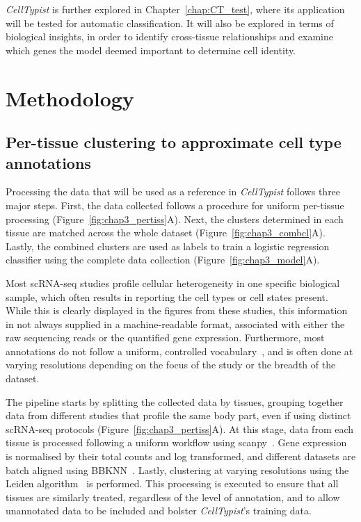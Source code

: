 \textit{CellTypist} is further explored in Chapter~\ref{chap:CT_test}, where its application will be tested for automatic classification. It will also be explored in terms of biological insights, in order to identify cross-tissue relationships and examine which genes the model deemed important to determine cell identity.



\section{Methodology}
\label{section3.2}
\subsection{Per-tissue clustering to approximate cell type annotations}
\label{section3.2.1}
Processing the data that will be used as a reference in \textit{CellTypist} follows three major steps. First, the data collected follows a procedure for uniform per-tissue processing (Figure~\ref{fig:chap3_pertiss}A). Next, the clusters determined in each tissue are matched across the whole dataset (Figure~\ref{fig:chap3_combcl}A). Lastly, the combined clusters are used as labels to train a logistic regression classifier using the complete data collection (Figure~\ref{fig:chap3_model}A).

Most scRNA-seq studies profile cellular heterogeneity in one specific biological sample, which often results in reporting the cell types or cell states present. While this is clearly displayed in the figures from these studies, this information in not always supplied in a machine-readable format, associated with either the raw sequencing reads or the quantified gene expression. Furthermore, most annotations do not follow a uniform, controlled vocabulary~\citep{bard_ontology_2005}, and is often done at varying resolutions depending on the focus of the study or the breadth of the dataset.

The pipeline starts by splitting the collected data by tissues, grouping together data from different studies that profile the same body part, even if using distinct scRNA-seq protocols (Figure~\ref{fig:chap3_pertiss}A). At this stage, data from each tissue is processed following a uniform workflow using scanpy~\citep{wolf_scanpy:_2018}. Gene expression is normalised by their total counts and log transformed, and different datasets are batch aligned using BBKNN~\citep{polanski_bbknn:_2019}. Lastly, clustering at varying resolutions using the Leiden algorithm~\citep{traag_louvain_2019} is performed. This processing is executed to ensure that all tissues are similarly treated, regardless of the level of annotation, and to allow unannotated data to be included and bolster \textit{CellTypist}'s training data.

